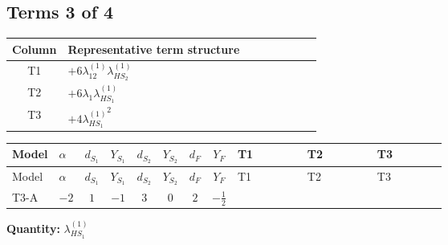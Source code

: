 \documentclass[8pt]{article}
\begin{document}
\begin{landscape}
\subsection*{Terms 3 of 4}
\begin{center}
\begin{tabular}{@{}c >{\raggedright\arraybackslash}p{0.82\linewidth}@{}}
\toprule
Column & Representative term structure \\
\midrule
T1 & \(\displaystyle +6 {\lambda_{12}^{(1)}} {\lambda_{HS_2}^{(1)}}\) \\
\midrule
T2 & \(\displaystyle +6 {\lambda_1} {\lambda_{HS_1}^{(1)}}\) \\
\midrule
T3 & \(\displaystyle +4 {\lambda_{HS_1}^{(1)}}^2\) \\
\midrule
\bottomrule
\end{tabular}
\end{center}
\smallskip
\tiny
\begin{longtable}{@{}llcccccc >{\raggedright\arraybackslash}p{0.21\linewidth} >{\raggedright\arraybackslash}p{0.21\linewidth} >{\raggedright\arraybackslash}p{0.21\linewidth}@{}}
\toprule
Model & $\alpha$ & $d_{S_1}$ & $Y_{S_1}$ & $d_{S_2}$ & $Y_{S_2}$ & $d_F$ & $Y_F$ & T1 & T2 & T3 \\
\midrule
\endfirsthead
\toprule
Model & $\alpha$ & $d_{S_1}$ & $Y_{S_1}$ & $d_{S_2}$ & $Y_{S_2}$ & $d_F$ & $Y_F$ & T1 & T2 & T3 \\
\midrule
\endhead
T3-A & $-2$ & $1$ & $-1$ & $3$ & $0$ & $2$ & $-\frac{1}{2}$ & \scriptsize\adjustbox{max width=\linewidth}{$\begin{gathered} +6 {\lambda_{12}^{(1)}} {\lambda_{HS_2}^{(1)}}\end{gathered}$} & \scriptsize\adjustbox{max width=\linewidth}{$\begin{gathered} +6 {\lambda_1} {\lambda_{HS_1}^{(1)}}\end{gathered}$} & \scriptsize\adjustbox{max width=\linewidth}{$\begin{gathered} +4 {\lambda_{HS_1}^{(1)}}^2\end{gathered}$} \\
\midrule
\bottomrule
\end{longtable}
\clearpage
\noindent\textbf{Quantity: }$\lambda_{HS_1}^{(1)}$\par\smallskip

\end{landscape}
\end{document}
